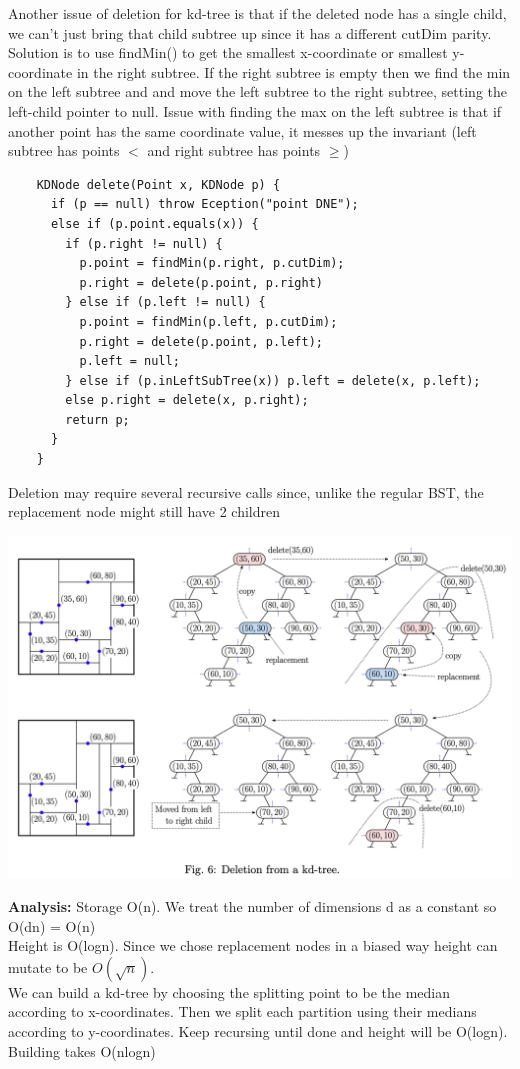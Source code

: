 \documentclass{article}
\begin{document}
  \newpage
  \noindent Another issue of deletion for kd-tree is that if the deleted node has a single child, we can't just bring that child subtree up since it has a different cutDim parity. Solution is to use findMin() to get the smallest x-coordinate or smallest y-coordinate in the right subtree. If the right subtree is empty then we find the min on the left subtree and and move the left subtree to the right subtree, setting the left-child pointer to null. Issue with finding the max on the left subtree is that if another point has the same coordinate value, it messes up the invariant (left subtree has points $<$ and right subtree has points $\geq$)
  \begin{lstlisting}
    KDNode delete(Point x, KDNode p) {
      if (p == null) throw Eception("point DNE");
      else if (p.point.equals(x)) {
        if (p.right != null) {
          p.point = findMin(p.right, p.cutDim);
          p.right = delete(p.point, p.right)
        } else if (p.left != null) {
          p.point = findMin(p.left, p.cutDim);
          p.right = delete(p.point, p.left);
          p.left = null;
        } else if (p.inLeftSubTree(x)) p.left = delete(x, p.left);
        else p.right = delete(x, p.right);
        return p;
      }
    }
  \end{lstlisting}
  Deletion may require several recursive calls since, unlike the regular BST, the replacement node might still have 2 children
  \begin{center}
  \includegraphics[scale=0.4]{KDTreeDeletion}
  \end{center}
  \textbf{Analysis: }Storage O(n). We treat the number of dimensions d as a constant so O(dn) = O(n)\\
  Height is O(logn). Since we chose replacement nodes in a biased way height can mutate to be $O(\sqrt{n})$.\\
  We can build a kd-tree by choosing the splitting point to be the median according to x-coordinates. Then we split each partition using their medians according to y-coordinates. Keep recursing until done and height will be O(logn). Building takes O(nlogn)\\ \\
\end{document}
